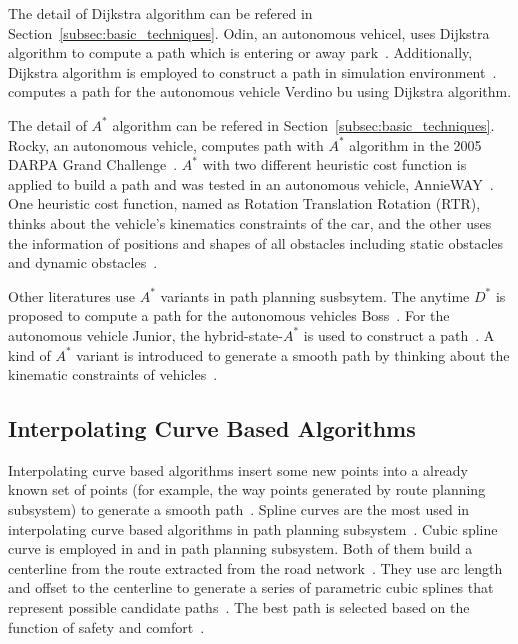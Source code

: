 \documentclass[conference]{IEEEtran}
\begin{document}
The detail of Dijkstra algorithm can be refered in Section~\ref{subsec:basic_techniques}. Odin, an autonomous vehicel, uses Dijkstra algorithm to compute a path which is entering or away park~\cite{bacha2008odin}. Additionally, Dijkstra algorithm is employed to construct a path in simulation environment~\cite{kala2013multi}. \cite{arnay2016safe} computes a path for the autonomous vehicle Verdino bu using Dijkstra algorithm.

The detail of $A^*$ algorithm can be refered in Section~\ref{subsec:basic_techniques}. Rocky, an autonomous vehicle, computes path with $A^*$ algorithm in the 2005 DARPA Grand Challenge~\cite{Leedy2007}. $A^*$ with two different heuristic cost function is applied to build a path and was tested in an autonomous vehicle, AnnieWAY~\cite{Ziegler2008787}. One heuristic cost function, named as Rotation Translation Rotation (RTR), thinks about the vehicle's kinematics constraints of the car, and the other uses the information of positions and shapes of all obstacles including static obstacles and dynamic obstacles~\cite{Ziegler2008787}.

Other literatures use $A^*$ variants in path planning susbsytem. The anytime $D^*$ is proposed to compute a path for the autonomous vehicles Boss~\cite{Urmson2008}. For the autonomous vehicle Junior, the hybrid-state-$A^*$ is used to construct a path~\cite{Dmitri2010path}. A kind of $A^*$ variant is introduced to generate a smooth path by thinking about the kinematic constraints of vehicles~\cite{chu2015real}.

\subsection{Interpolating Curve Based Algorithms}
Interpolating curve based algorithms insert some new points into a already known set of points (for example, the way points generated by route planning subsystem) to generate a smooth path~\cite{self_driving}. Spline curves are the most used in interpolating curve based algorithms in path planning subsystem~\cite{self_driving}. Cubic spline curve is employed in \cite{chu2012local} and \cite{HU2018482} in path planning subsystem. Both of them build a centerline from the route extracted from the road network~\cite{chu2012local, HU2018482}. They use arc length and offset to the centerline to generate a series of parametric cubic splines that represent possible candidate paths~\cite{chu2012local, HU2018482}. The best path is selected based on the function of safety and comfort~\cite{chu2012local, HU2018482}.
\end{document}
